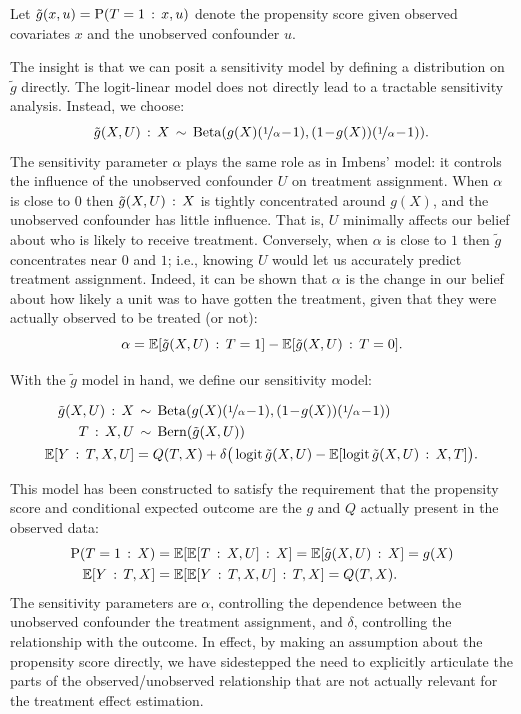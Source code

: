 \documentclass{article}
\begin{document}
\begin{defn}
Let $\tilde{g}(x,u)=\Pr(T=1\given x,u)$ denote the propensity score
given observed covariates $x$ and the unobserved confounder $u$.
\end{defn}
The insight is that we can posit a sensitivity model by defining a distribution
on $\tilde{g}$ directly.
The logit-linear model does not directly lead to a tractable sensitivity analysis. 
Instead, we choose:%
\[
\tilde{g}(X,U)\given X \!\dist\! \betaDist(g(X)(\nicefrac{1}{\alpha}\!-\!1), (1\!-\!g(X))(\nicefrac{1}{\alpha}\!-\!1)).
\]
The sensitivity parameter $\alpha$ plays the same role as in Imbens'
model: it controls the influence of the unobserved confounder $U$ on treatment assignment.
When $\alpha$ is close to $0$ then $\tilde{g}(X,U)\given X$ is tightly concentrated around $g(X)$, and
the unobserved confounder has little influence. That is, $U$ minimally affects our belief about
who is likely to receive treatment.
Conversely, when $\alpha$ is close to $1$ then $\tilde{g}$ concentrates near $0$ and $1$;
i.e., knowing $U$ would let us accurately predict treatment assignment.
%
Indeed, it can be shown that $\alpha$ is the change in our belief about how likely
a unit was to have gotten the treatment, given that they were actually
observed to be treated (or not):
\begin{equation}
 \label{eq:alpha-interp}
 \alpha=\EE[\tilde{g}(X,U) \given T=1]-\EE[\tilde{g}(X,U) \given T=0].
 \end{equation}


With the $\tilde{g}$ model in hand, we define our sensitivity model:
\begin{gassumption}\label{ass:main-sensitivity-model}
\begin{align*}
\tilde{g}(X,U)\given X & \!\dist\! \betaDist(g(X)(\nicefrac{1}{\alpha}\!-\!1), (1\!-\!g(X))(\nicefrac{1}{\alpha}\!-\!1)) \\
T\given X,U & \!\dist\! \bernDist(\tilde{g}(X,U)) \\
  \EE[Y\given T,X,U] & = Q(T,X) + \delta \big( \logit\tilde{g}(X,U) - \EE[\logit\tilde{g}(X,U)\given X,T] \big).
\end{align*}
\end{gassumption}
This model has been constructed to satisfy the requirement
that the propensity score and conditional expected outcome
are the $g$ and $Q$ actually present in the observed data:
\begin{align*}
\Pr(T=1\given X) & = \EE[\EE[T \given X,U] \given X] = \EE[\tilde{g}(X,U)\given X]=g(X)\\
\EE[Y\given T,X] & = \EE[\EE[Y \given T,X,U] \given T,X] = Q(T,X).
\end{align*}
The sensitivity parameters are $\alpha$, controlling
the dependence between the unobserved confounder the treatment assignment,
and $\delta$, controlling the relationship with the outcome.
In effect, by making an assumption about the propensity score directly,
we have sidestepped the need to explicitly articulate the parts of
the observed/unobserved relationship that are not actually relevant
for the treatment effect estimation.
%
%
 
\end{document}

